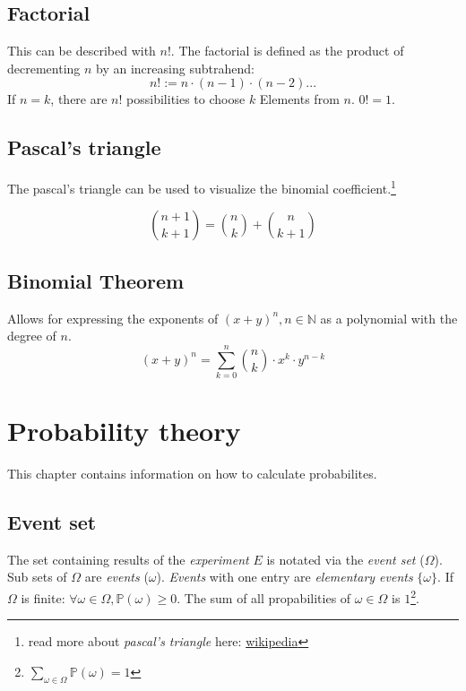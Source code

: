 \documentclass[twoside, a4paper, twocolumn]{article}
\begin{document}
    \subsection{Factorial}
    This can be described with $n!$. The factorial is defined as the
    product of decrementing $n$ by an increasing subtrahend:
    \begin{equation}
        n! := n \cdot (n-1) \cdot (n-2) \textrm{...}
    \end{equation}
    If $n = k$, there are $n!$ possibilities to choose $k$ Elements from $n$.
    $0! = 1$.

    \subsection{Pascal's triangle}
    The pascal's triangle can be used to visualize the binomial
    coefficient.\footnote{read more about \textit{pascal's triangle}
    here: \href{https://en.wikipedia.org/wiki/Pascal's_triangle}{wikipedia}}

    \begin{equation}
        \binom{n+1}{k+1} = \binom{n}{k} + \binom{n}{k+1}
    \end{equation}

    \subsection{Binomial Theorem}
    Allows for expressing the exponents of $(x+y)^n, n \in \mathbb{N}$ as a
    polynomial with the degree of $n$.
    \begin{equation}
        (x+y)^n = \sum^n_{k=0} \binom{n}{k} \cdot x^k \cdot y^{n-k}
    \end{equation}

    \section{Probability theory}
    This chapter contains information on how to calculate probabilites.

    \subsection{Event set} The set containing results of the
    \textit{experiment} $E$ is notated via the \textit{event set} ($\Omega$).
    Sub sets of $\Omega$ are \textit{events} ($\omega$). \textit{Events} with
    one entry are \textit{elementary events} $\{\omega\}$. If $\Omega$ is
    finite: $\forall \omega \in \Omega,\mathbb{P}(\omega) \geq 0$. The sum of
    all propabilities of $\omega \in \Omega$ is $1$\footnote{$\sum_{\omega \in
    \Omega} \mathbb{P}(\omega) = 1$}.
\end{document}
